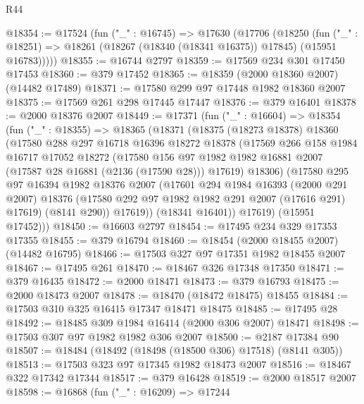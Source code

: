 \begin{lexlean}{R44}
\begin{coremodule}
@18354 := @17524
    (fun ("_" : @16745) =>
    @17630
      (@17706
        (@18250
          (fun ("_" : @18251) => @18261 (@18267 (@18340 (@18341 @16375)) @17845) (@15951 @16783)))))
@18355 := @16744 @2797
@18359 := @17569 @234 @301 @17450 @17453
@18360 := @379 @17452
@18365 := @18359 (@2000 @18360 @2007) (@14482 @17489)
@18371 := @17580 @299 @97 @17448 @1982 @18360 @2007
@18375 := @17569 @261 @298 @17445 @17447
@18376 := @379 @16401
@18378 := @2000 @18376 @2007
@18449 := @17371
    (fun ("_" : @16604) =>
    @18354
      (fun ("_" : @18355) =>
      @18365
        (@18371
          (@18375
            (@18273 @18378)
            @18360
            (@17580
              @288
              @297
              @16718
              @16396
              @18272
              @18378
              (@17569
                @266
                @158
                @1984
                @16717
                @17052
                @18272
                (@17580
                  @156
                  @97
                  @1982
                  @1982
                  @16881
                  @2007
                  (@17587 @28 @16881 (@2136 (@17590 @28)))
                  @17619)
                @18306)
              (@17580
                @295
                @97
                @16394
                @1982
                @18376
                @2007
                (@17601
                  @294
                  @1984
                  @16393
                  (@2000 @291 @2007)
                  @18376
                  (@17580 @292 @97 @1982 @1982 @291 @2007 (@17616 @291) @17619)
                  (@8141 @290))
                @17619))
            (@18341 @16401))
          @17619)
        (@15951 @17452)))
@18450 := @16603 @2797
@18454 := @17495 @234 @329 @17353 @17355
@18455 := @379 @16794
@18460 := @18454 (@2000 @18455 @2007) (@14482 @16795)
@18466 := @17503 @327 @97 @17351 @1982 @18455 @2007
@18467 := @17495 @261
@18470 := @18467 @326 @17348 @17350
@18471 := @379 @16435
@18472 := @2000 @18471
@18473 := @379 @16793
@18475 := @2000 @18473 @2007
@18478 := @18470 (@18472 @18475) @18455
@18484 := @17503 @310 @325 @16415 @17347 @18471 @18475
@18485 := @17495 @28
@18492 := @18485 @309 @1984 @16414 (@2000 @306 @2007) @18471
@18498 := @17503 @307 @97 @1982 @1982 @306 @2007
@18500 := @2187 @17384 @90
@18507 := @18484 (@18492 (@18498 (@18500 @306) @17518) (@8141 @305))
@18513 := @17503 @323 @97 @17345 @1982 @18473 @2007
@18516 := @18467 @322 @17342 @17344
@18517 := @379 @16428
@18519 := @2000 @18517 @2007
@18598 := @16868
    (fun ("_" : @16209) =>
    @17244

\end{coremodule}
\end{lexlean}
